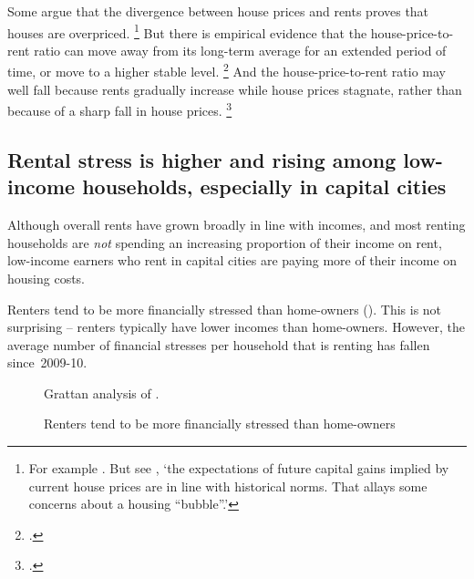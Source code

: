 Some argue that the divergence between house prices and rents proves that houses are overpriced.%
	\footnote{For example \textcites{Soos-2011-bubbling-over}{Janda2014}.
	But see \textcite{FoxTulip2014overvalued}, `the expectations of future capital gains implied by current house prices are in line with historical norms.
	That allays some concerns about a housing ``bubble''.'}
But there is empirical evidence that the house-price-to-rent ratio can move away from its long-term average for an extended period of time, or move to a higher stable level.%
	\footcites{Ambroseetal2013}{Sommeretal-2010}[][11]{2010BirdsEyeView}
And the house-price-to-rent ratio may well fall because rents gradually increase while house prices stagnate, rather than because of a sharp fall in house prices.%
    \footcite{Andre2010birds}

\subsection{Rental stress is higher and rising among low-income households, especially in capital cities }\label{subsec:rental-stress-is-higher-among-low-income-households-especially-in-capital-cities}
Although overall rents have grown broadly in line with incomes, and most renting households are \emph{not} spending an increasing proportion of their income on rent, low-income earners who rent in capital cities are paying more of their income on housing costs.

Renters tend to be more financially stressed than home-owners ().
This is not surprising -- renters typically have lower incomes than home-owners. However, the average number of financial stresses per household that is renting has fallen since~2009-10.

\begin{figure}
\caption{Renters tend to be more financially stressed than home-owners}\label{fig:financial-stresses}
%
{Grattan analysis of \textcite{ABS-HES-201516-Microdata}.}
\end{figure}

